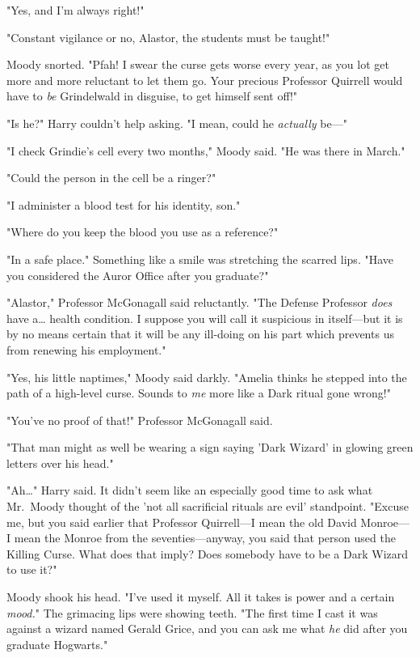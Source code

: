 "Yes, and I'm always right!"

"Constant vigilance or no, Alastor, the students must be taught!"

Moody snorted. "Pfah! I swear the curse gets worse every year, as you lot get more and more reluctant to let them go. Your precious Professor Quirrell would have to \emph{be} Grindelwald in disguise, to get himself sent off!"

"Is he?" Harry couldn't help asking. "I mean, could he \emph{actually} be---"

"I check Grindie's cell every two months," Moody said. "He was there in March."

"Could the person in the cell be a ringer?"

"I administer a blood test for his identity, son."

"Where do you keep the blood you use as a reference?"

"In a safe place." Something like a smile was stretching the scarred lips. "Have you considered the Auror Office after you graduate?"

"Alastor," Professor McGonagall said reluctantly. "The Defense Professor \emph{does} have a{\ldots} health condition. I suppose you will call it suspicious in itself---but it is by no means certain that it will be any ill-doing on his part which prevents us from renewing his employment."

"Yes, his little naptimes," Moody said darkly. "Amelia thinks he stepped into the path of a high-level curse. Sounds to \emph{me} more like a Dark ritual gone wrong!"

"You've no proof of that!" Professor McGonagall said.

"That man might as well be wearing a sign saying 'Dark Wizard' in glowing green letters over his head."

"Ah{\ldots}" Harry said. It didn't seem like an especially good time to ask what Mr.~Moody thought of the 'not all sacrificial rituals are evil' standpoint. "Excuse me, but you said earlier that Professor Quirrell---I mean the old David Monroe---I mean the Monroe from the seventies---anyway, you said that person used the Killing Curse. What does that imply? Does somebody have to be a Dark Wizard to use it?"

Moody shook his head. "I've used it myself. All it takes is power and a certain \emph{mood.}" The grimacing lips were showing teeth. "The first time I cast it was against a wizard named Gerald Grice, and you can ask me what \emph{he} did after you graduate Hogwarts."

